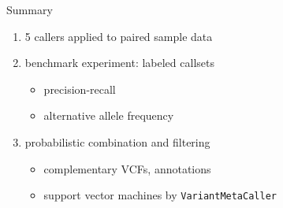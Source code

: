 \documentclass{beamer}
\begin{document}

\begin{frame}{Summary}
\begin{enumerate}
\item 5 callers applied to paired sample data
\item benchmark experiment: labeled callsets
\begin{itemize}
\item precision-recall
\item alternative allele frequency
\end{itemize}
\item probabilistic combination and filtering
\begin{itemize}
\item complementary VCFs, annotations
\item support vector machines by \texttt{VariantMetaCaller}
\end{itemize}
\end{enumerate}
\end{frame}
\end{document}
